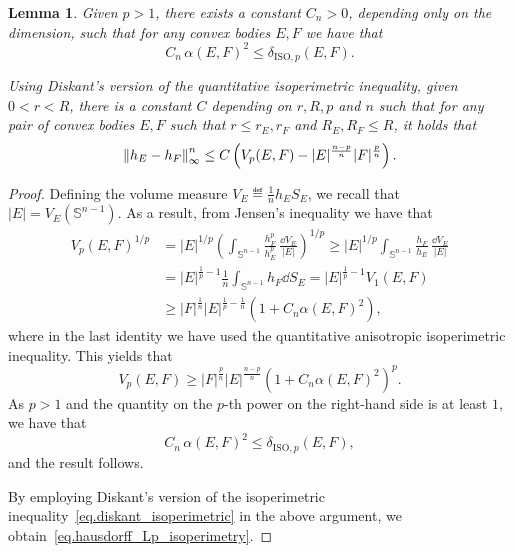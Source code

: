 \documentclass[a4paper, 10pt, twoside]{amsart}
\numberwithin{equation}{section}
\newcommand{\lemmname}{Lemma}
\theoremstyle{plain}
\newtheorem{lemma}[theorem]{\lemmname}
\theoremstyle{definition}
\begin{document}
\begin{lemma}\label{lemma.quantitative_Lp_isoperimetric}
    Given $p > 1$, there exists a constant $C_n > 0$, depending only on the dimension, such that for any convex bodies $E,F$ we have that
    \begin{equation}\label{eq.fraenkel_Lp_isoperimetry}
        C_n\, \alpha(E,F)^2 \le \delta_{\textrm{ISO},p}(E,F).
    \end{equation}

    Using Diskant's version of the quantitative isoperimetric inequality, given $0 <r <R$, there is a constant $C$ depending on $r,R,p$ and $n$ such that for any pair of convex bodies $E,F$ such that $r\le r_E, r_F$ and $R_E,R_F \le R$, it holds that 
    \begin{equation}\label{eq.hausdorff_Lp_isoperimetry}
        \left\lVert h_E - h_F\right\rVert_\infty^n\le C \left(V_p(E,F) - |E|^{\frac{n-p}{n}}|F|^{\frac{p}{n}}\right).
    \end{equation}
\end{lemma}
\begin{proof}
    Defining the volume measure $V_E \eqdef \frac{1}{n} h_E S_E$, we recall that $|E| = V_E(\mathbb{S}^{n-1})$. As a result, from Jensen's inequality we have that 
    \begin{align*}
        {V_p(E,F)}^{1/p} 
        &= 
        {|E|}^{1/p}
        {\left(
            \int_{\mathbb{S}^{n-1}} 
            \frac{h^p_F}{h^p_E}\,
            \frac{\dd V_E}{|E|}
        \right)}^{1/p}
        \ge 
         {|E|}^{1/p}
        \int_{\mathbb{S}^{n-1}} 
        \frac{h_F}{h_E}\,
        \frac{\dd V_E}{|E|}\\
        &= 
        |E|^{\frac{1}{p} - 1}
        \frac{1}{n}
        \int_{\mathbb{S}^{n-1}} 
        h_F\dd S_E 
        = 
        |E|^{\frac{1}{p} - 1}
        V_1(E,F)
        \\
        & \ge 
        |F|^{\frac{1}{n}} 
        |E|^{\frac{1}{p} - \frac{1}{n}} 
        \left(
            1 + C_n\alpha(E,F)^2
        \right),
    \end{align*}
    where in the last identity we have used the quantitative anisotropic isoperimetric inequality. This yields that
    \[
        V_p(E,F)
        \ge 
        |F|^{\frac{p}{n}} 
        |E|^{\frac{n-p}{n}} 
        \left(
            1 + C_n\alpha(E,F)^2
        \right)^p.
    \]
    As $p > 1$ and the quantity on the $p$-th power on the right-hand side is at least $1$, we have that 
    \[
        C_n\, \alpha(E,F)^2 \le 
        \delta_{\text{ISO},p}(E,F),
    \]
    and the result follows.  

    By employing Diskant's version of the isoperimetric inequality~\eqref{eq.diskant_isoperimetric} in the above argument, we obtain~\eqref{eq.hausdorff_Lp_isoperimetry}. 
\end{proof}
\end{document}
